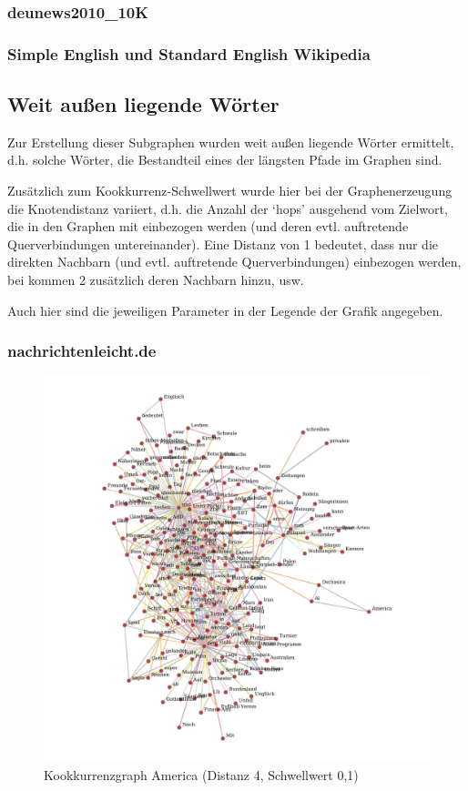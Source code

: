 \documentclass[11pt, a4paper]{article}
\begin{document}
\subsubsection{deunews2010\_10K}


\subsubsection{Simple English und Standard English Wikipedia}


\subsection{Weit außen liegende Wörter}

Zur Erstellung dieser Subgraphen wurden weit außen liegende Wörter ermittelt,
d.h. solche Wörter, die Bestandteil eines der längsten Pfade im Graphen sind.

Zusätzlich zum Kookkurrenz-Schwellwert wurde hier bei der Graphenerzeugung
die Knotendistanz variiert, d.h. die Anzahl der `hops' ausgehend vom Zielwort,
die in den Graphen mit einbezogen werden (und deren evtl. auftretende
Querverbindungen untereinander).
Eine Distanz von 1 bedeutet, dass nur die direkten Nachbarn (und evtl.
auftretende Querverbindungen) einbezogen werden, bei kommen 2 zusätzlich deren
Nachbarn hinzu, usw.

Auch hier sind die jeweiligen Parameter in der Legende der Grafik angegeben.

\label{sec:aussen_liegende}

\subsubsection{nachrichtenleicht.de}

\begin{figure}[hp!]
    \centering
        \includegraphics[scale=.4]{../../data/results/longpath_wordgraphs/nl/graph_America.pdf}
    \caption{Kookkurrenzgraph America (Distanz 4, Schwellwert 0,1)}
\end{figure}
\end{document}
